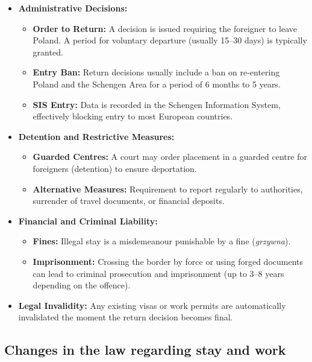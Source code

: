 \begin{itemize}
\tightlist
\item
  \textbf{Administrative Decisions:}

  \begin{itemize}
  \tightlist
  \item
    \textbf{Order to Return:} A decision is issued requiring the
    foreigner to leave Poland. A period for voluntary departure (usually
    15--30 days) is typically granted.
  \item
    \textbf{Entry Ban:} Return decisions usually include a ban on
    re-entering Poland and the Schengen Area for a period of 6 months to
    5 years.
  \item
    \textbf{SIS Entry:} Data is recorded in the Schengen Information
    System, effectively blocking entry to most European countries.
  \end{itemize}
\item
  \textbf{Detention and Restrictive Measures:}

  \begin{itemize}
  \tightlist
  \item
    \textbf{Guarded Centres:} A court may order placement in a guarded
    centre for foreigners (detention) to ensure deportation.
  \item
    \textbf{Alternative Measures:} Requirement to report regularly to
    authorities, surrender of travel documents, or financial deposits.
  \end{itemize}
\item
  \textbf{Financial and Criminal Liability:}

  \begin{itemize}
  \tightlist
  \item
    \textbf{Fines:} Illegal stay is a misdemeanour punishable by a fine
    (\emph{grzywna}).
  \item
    \textbf{Imprisonment:} Crossing the border by force or using forged
    documents can lead to criminal prosecution and imprisonment (up to
    3--8 years depending on the offence).
  \end{itemize}
\item
  \textbf{Legal Invalidity:} Any existing visas or work permits are
  automatically invalidated the moment the return decision becomes
  final.
\end{itemize}


\clearpage


\subsection{Changes in the law regarding stay and
work}\label{sec-appen-changes-law}

